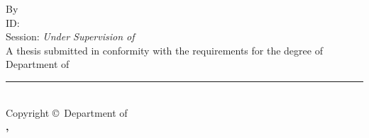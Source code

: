 \begin{titlepage}
    \linespread{1.75}
    \begin{center}
        \large
        {\Huge\textbf{\thesistitle}}
        \ifdefined\ARCTHIRDCOPY
            \vfill By \vfill
            \textbf{\MakeUppercase{\myname}} \\ ID: \mystdid \\ Session: \mysession
            \vfill {} \vfill
            {\itshape\Large Under Supervision of} \\
            {\textbf{\supervisorname}} \vfill
        \else
            \vfill {} \vfill
        \fi
        A thesis submitted in conformity with the requirements for the degree of \textbf{\itshape \mydegree}
        \vfill Department of {\textbf{\deptname \\
        \institutename}} \vfill
        \noindent\rule{\textwidth}{1pt} \\
        Copyright \copyright \ Department of \\
        \textbf{\deptname, \institutename} \\ \mydate
    \end{center}
    \restoregeometry
\end{titlepage}
